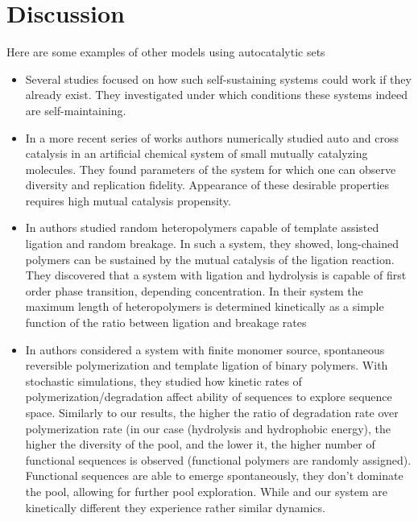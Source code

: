 \documentclass[journal=jacsat,manuscript=article,layout=twocolumn]{achemso}
\begin{document}
\section{Discussion}


Here are some examples of other models using autocatalytic sets
\begin{itemize}
 \item Several studies\cite{Eigen1978,Dyson1985,Kauffman1986} focused on how such self-sustaining 
systems could work if they already exist. They investigated under which conditions these systems 
indeed are self-maintaining.

\item In a more recent series of works \cite{segre1998graded,Segre2000,Markovitch2012} 
 authors numerically studied auto and cross catalysis in an artificial chemical system of 
 small mutually catalyzing  molecules. They found parameters of the system for which one can 
observe 
diversity and replication fidelity.
 Appearance of these desirable properties requires high mutual catalysis propensity.

\item In \cite{Tkachenko2014} authors studied random heteropolymers capable of template 
assisted ligation and random breakage. In such a system, they showed,  long-chained
polymers  can be sustained by the mutual catalysis of the ligation reaction. They discovered
that a system with ligation and hydrolysis is capable of first order phase transition, depending 
concentration. 
In their system the maximum length of heteropolymers is determined kinetically as a simple function 
of the ratio
between ligation and breakage rates

\item In \cite{Walker2012} authors considered a system with finite monomer source, spontaneous 
reversible polymerization
and template ligation of binary polymers. With stochastic simulations, they studied how kinetic 
rates of polymerization/degradation
affect ability of sequences to explore sequence space. Similarly to our results, the higher the 
ratio of degradation rate
over polymerization rate (in our case (hydrolysis and hydrophobic energy), the higher the diversity 
of the pool, and the lower it, the higher number of functional sequences is observed (functional 
polymers are randomly assigned). Functional sequences are able to emerge spontaneously,
they don't dominate the pool, allowing for further pool exploration. While \cite{Walker2012} and our 
system are kinetically different they experience rather similar dynamics.
\end{itemize}
\end{document}
